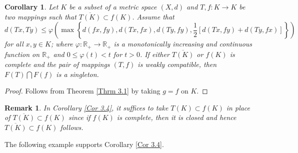 \documentclass[a4paper,12pt,oneside]{article}
\newtheorem{corollary}[theorem]{Corollary}
\newtheorem{remark}[theorem]{Remark}
\numberwithin{equation}{section}
\begin{document}
\begin{corollary} \label{Cor 3.4}
Let \(K\) be a subset of a metric space \((X,d)\) and \(T, f: K \to K\) be two mappings such that \(\overline{T(K)} \subset f(K)\). Assume that
\begin{equation} \label{(3.4.1)}
d(Tx, Ty) \leq \varphi \left( \max \left\{ d(fx, fy), d(Tx, fx), d(Ty, fy), \frac{1}{2}[d(Tx, fy) + d(Ty, fx)] \right\} \right)
\end{equation}
for all \(x, y \in K\); where \(\varphi: \mathbb{R}_{+} \to \mathbb{R}_{+}\) is a monotonically increasing and continuous function on \(\mathbb{R}_{+}\) and \(0 \leq \varphi(t) < t\) for \(t > 0\). If either \(\overline{T(K)}\) or \(f(K)\) is complete and the pair of mappings \((T,f)\) is weakly compatible, then \(F(T) \bigcap F(f)\) is a singleton.
\end{corollary}
\begin{proof}
    Follows from Theorem \eqref{Thrm 3.1} by taking \(g = f\) on \(K\).
\end{proof}

\begin{remark}
    In Corollary \eqref{Cor 3.4}, it suffices to take \(T(K) \subset f(K)\) in place of \(\overline{T(K)} \subset f(K)\) since if \(f(K)\) is complete, then it is closed and hence \(\overline{T(K)} \subset f(K)\) follows.
\end{remark}


The following example supports Corollary \eqref{Cor 3.4}.
\end{document}
